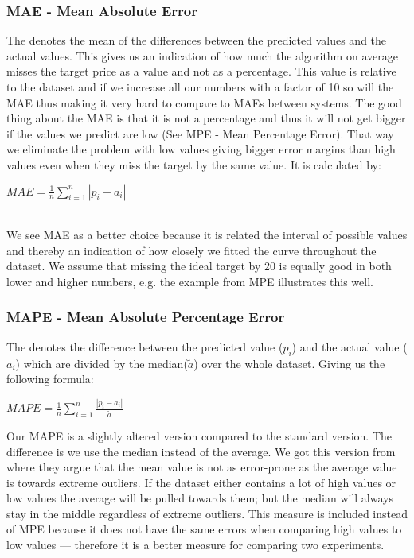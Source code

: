 \subsubsection{MAE - Mean Absolute Error}
\label{sec:maeStatistics}
The  denotes the mean of the differences between the predicted values and the actual values. This gives us an indication of how much the algorithm on average misses the target price as a value and not as a percentage. This value is relative to the dataset and if we increase all our numbers with a factor of 10 so will the MAE thus making it very hard to compare to MAEs between systems. The good thing about the MAE is that it is not a percentage and thus it will not get bigger if the values we predict are low (See MPE - Mean Percentage Error). That way we eliminate the problem with low values giving bigger error margins than high values even when they miss the target by the same value. It is calculated by:

\begin{center}
$MAE = \frac{1}{n}\sum_{i=1}^{n}|p_i-a_i|$
\end{center}

\\[0.5cm]
We see MAE as a better choice because it is related the interval of possible values and thereby an indication of how closely we fitted the curve throughout the dataset. We assume that missing the ideal target by 20 is equally good in both lower and higher numbers, e.g. the example from MPE illustrates this well.

\subsubsection{MAPE - Mean Absolute Percentage Error}
The  denotes the difference between the predicted value ($p_i$) and the actual value ($a_i$) which are divided by the median($\tilde{a}$) over the whole dataset. Giving us the following formula:


\begin{center}
$MAPE = \frac{1}{n}\sum_{i=1}^{n}\frac{|p_i-a_i|}{\tilde{a}}$
\end{center}

\noindent Our MAPE is a slightly altered version compared to the standard version. The difference is we use the median instead of the average. We got this version from \cite{yamin2004adaptive} where they argue that the mean value is not as error-prone as the average value is towards extreme outliers. If the dataset either contains a lot of high values or low values the average will be pulled towards them; but the median will always stay in the middle regardless of extreme outliers. This measure is included instead of MPE because it does not have the same errors when comparing high values to low values --- therefore it is a better measure for comparing two experiments.
